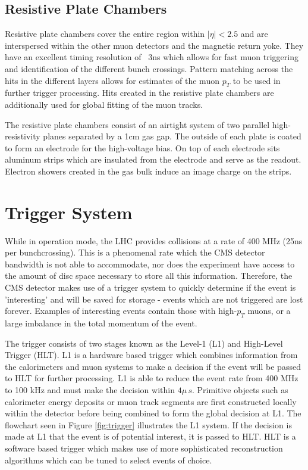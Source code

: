 \subsection{Resistive Plate Chambers}

Resistive plate chambers cover the entire region within $|\eta|<2.5$ and are interspersed within the other muon detectors and the magnetic return yoke. They have an excellent timing resolution of ~3ns which allows for fast muon triggering and identification of the different bunch crossings. Pattern matching across the hits in the different layers allows for estimates of the muon $p_{T}$ to be used in further trigger processing. Hits created in the resistive plate chambers are additionally used for global fitting of the muon tracks.

The resistive plate chambers consist of an airtight system of two parallel high-resistivity planes separated by a 1cm gas gap. The outside of each plate is coated to form an electrode for the high-voltage bias. On top of each electrode sits aluminum strips which are insulated from the electrode and serve as the readout. Electron showers created in the gas bulk induce an image charge on the strips.

\section{Trigger System}

While in operation mode, the LHC provides collisions at a rate of 400 MHz (25ns per bunchcrossing). This is a phenomenal rate which the CMS detector bandwidth is not able to accommodate, nor does the experiment have access to the amount of disc space necessary to store all this information. Therefore, the CMS detector makes use of a trigger system to quickly determine if the event is 'interesting' and will be saved for storage - events which are not triggered are lost forever. Examples of interesting events contain those with high-$p_{T}$ muons, or a large imbalance in the total momentum of the event.\cite{CMS-TRG-12-001}

The trigger consists of two stages known as the Level-1 (L1) and High-Level Trigger (HLT). L1 is a hardware based trigger which combines information from the calorimeters and muon systems to make a decision if the event will be passed to HLT for further processing. L1 is able to reduce the event rate from 400 MHz to 100 kHz and must make the decision within $4\mu\,s$. Primitive objects such as calorimeter energy deposits or muon track segments are first constructed locally within the detector before being combined to form the global decision at L1. The flowchart seen in Figure \ref{fig:trigger} illustrates the L1 system. If the decision is made at L1 that the event is of potential interest, it is passed to HLT. HLT is a software based trigger which makes use of more sophisticated reconstruction algorithms which can be tuned to select events of choice.

